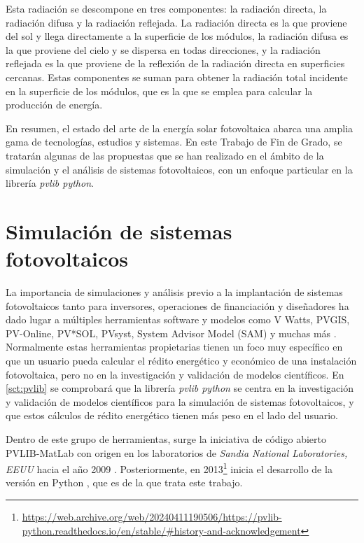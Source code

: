 Esta radiación se descompone en tres componentes: la radiación directa, la radiación difusa y la radiación reflejada. La radiación directa es la que proviene del sol y llega directamente a la superficie de los módulos, la radiación difusa es la que proviene del cielo y se dispersa en todas direcciones, y la radiación reflejada es la que proviene de la reflexión de la radiación directa en superficies cercanas. Estas componentes se suman para obtener la radiación total incidente en la superficie de los módulos, que es la que se emplea para calcular la producción de energía.

En resumen, el estado del arte de la energía solar fotovoltaica abarca una amplia gama de tecnologías, estudios y sistemas. En este Trabajo de Fin de Grado, se tratarán algunas de las propuestas que se han realizado en el ámbito de la simulación y el análisis de sistemas fotovoltaicos, con un enfoque particular en la librería \textit{pvlib python}.

\section{Simulación de sistemas fotovoltaicos} \label{sct:simulaciones}

La importancia de simulaciones y análisis previo a la implantación de sistemas fotovoltaicos tanto para inversores, operaciones de financiación y diseñadores ha dado lugar a múltiples herramientas software y modelos como V Watts, PVGIS, PV-Online, PV*SOL, PVsyst, System Advisor Model (SAM) y muchas más \cite{stein_models_2009, Kumar_2017}. Normalmente estas herramientas propietarias tienen un foco muy específico en que un usuario pueda calcular el rédito energético y económico de una instalación fotovoltaica, pero no en la investigación y validación de modelos científicos. En \ref{sct:pvlib} se comprobará que la librería \textit{pvlib python} se centra en la investigación y validación de modelos científicos para la simulación de sistemas fotovoltaicos, y que estos cálculos de rédito energético tienen más peso en el lado del usuario.

Dentro de este grupo de herramientas, surge la iniciativa de código abierto PVLIB-MatLab con origen en los laboratorios de \textit{Sandia National Laboratories, EEUU} hacia el año 2009 \cite{Stein_Holmgren_Forbess_Hansen_2016}. Posteriormente, en 2013\footnote{\url{https://web.archive.org/web/20240411190506/https://pvlib-python.readthedocs.io/en/stable/\#history-and-acknowledgement}} inicia el desarrollo de la versión en Python \cite{Anderson_Hansen_Holmgren_Jensen_Mikofski_Driesse_2023, Stein_2012, Andrews_Stein_Hansen_Riley_2014, Holmgren_Andrews_Lorenzo_Stein_2015, Holmgren_Groenendyk_2016}, que es de la que trata este trabajo.

